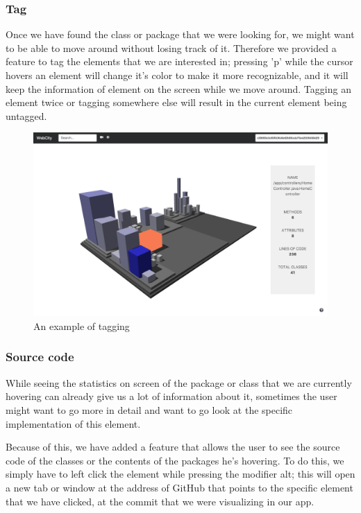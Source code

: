 \documentclass[]{usiinfbachelorproject}
\begin{document}
\subsubsection{Tag} \label{Tag}
Once we have found the class or package that we were looking for, we might want to be able to move around without losing track of it. Therefore we provided a feature to tag the elements
that we are interested in; pressing 'p' while the cursor hovers an element will change it's color to make it more recognizable, and it will keep the information of element on the screen
while we move around. Tagging an element twice or tagging somewhere else will result in the current element being untagged.

\begin{figure} [H]
\centering
\includegraphics[width=1\textwidth]{pictures/tag.png}
\caption{An example of tagging}
\label{fig:tag}
\end{figure}

\subsubsection{Source code} \label{Source code}
While seeing the statistics on screen of the package or class that we are currently hovering can already give us a lot of information about it, sometimes the user might want to go more in detail and want to go look at the specific implementation of this element.

Because of this, we have added a feature that allows the user to see the source code of the classes or the contents of the packages he's hovering. To do this, we simply have to left click the element while pressing the modifier alt; this will open a new tab or window at the address of GitHub that points to the specific element that we have clicked, at the commit that we were visualizing in our app.
\end{document}
